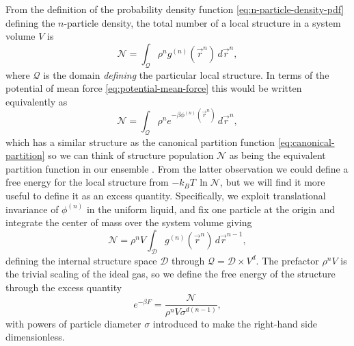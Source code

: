 \documentclass[11pt,twoside]{report}
\begin{document}
From the definition of the probability density function  \eqref{eq:n-particle-density-pdf} defining the $n$-particle density, the total number of a local structure in a system volume $V$ is
\begin{equation}\label{eq:structure-population}
  \mathcal{N} =
  \int_{\mathcal{Q}} \rho^n g^{(n)}(\vec{r}^n) \, d\vec{r}^n,
\end{equation}
where $\mathcal{Q}$ is the domain \emph{defining} the particular local structure.
In terms of the potential of mean force \eqref{eq:potential-mean-force} this would be written equivalently as
\begin{equation*}
  \mathcal{N} =
  \int_{\mathcal{Q}} \rho^n e^{-\beta \phi^{(n)}(\vec{r}^n)} \, d\vec{r}^n,
\end{equation*}
which has a similar structure as the canonical partition function \eqref{eq:canonical-partition} so we can think of structure population $\mathcal{N}$ as being the equivalent partition function in our ensemble%
.
From the latter observation we could define a free energy for the local structure from $-k_B T \, \ln{\mathcal{N}}$,
but we will find it more useful to define it as an excess quantity.
Specifically, we exploit translational invariance of $\phi^{(n)}$ in the uniform liquid, and fix one particle at the origin and integrate the center of mass over the system volume giving
\begin{equation}
  \mathcal{N} =
  \rho^n V \int_\mathcal{D} g^{(n)}(\vec{r}^n) \, d\vec{r}^{n-1},
\end{equation}
defining the internal structure space $\mathcal{D}$ through $\mathcal{Q} = \mathcal{D} \times V^d$.
The prefactor $\rho^n V$ is the trivial scaling of the ideal gas, so we define the free energy of the structure through the excess quantity%
\begin{equation*}
  e^{-\beta F}
  =
  \frac{\mathcal{N}}{\rho^n V \sigma^{d(n-1)}},
\end{equation*}
with powers of particle diameter $\sigma$ introduced to make the right-hand side dimensionless.
\end{document}
